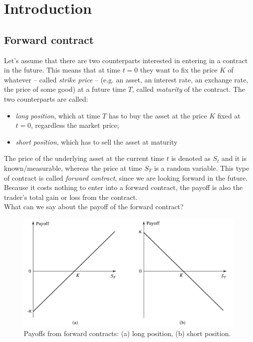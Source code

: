 \chapter{Introduction} %
\section{Forward contract} 
Let's assume that there are two counterparts interested in entering in a contract in the future. This means that at time $t=0$ they want to fix the price $K$ of whatever -- called \emph{strike price} -- (e.g. an asset, an interest rate, an exchange rate, the price of some good) at a future time $T$, called \emph{maturity} of the contract. The two counterparts are called:
\begin{itemize}
    \item \emph{long position}, which at time $T$ has to buy the asset at the price $K$ fixed at $t=0$, regardless the market price;
    \item \emph{short position}, which has to sell the asset at maturity
\end{itemize}
The price of the underlying asset at the current time $t$ is denoted as $S_t$ and it is known/measurable, whereas the price at time $S_T$ is a random variable. This type of contract is called \emph{forward contract}, since we are looking forward in the future. Because it costs nothing to enter into a forward contract, the payoff is also the trader’s total gain or loss from the contract.\\
What can we say about the payoff of the forward contract? 
\begin{figure}
    \centering
    \includegraphics[scale=0.2]{fig/fc_payoff.png}
    \caption{Payoffs from forward contracts: (a) long position, (b) short position.}
    \label{fig:fc_payoff}
\end{figure}
